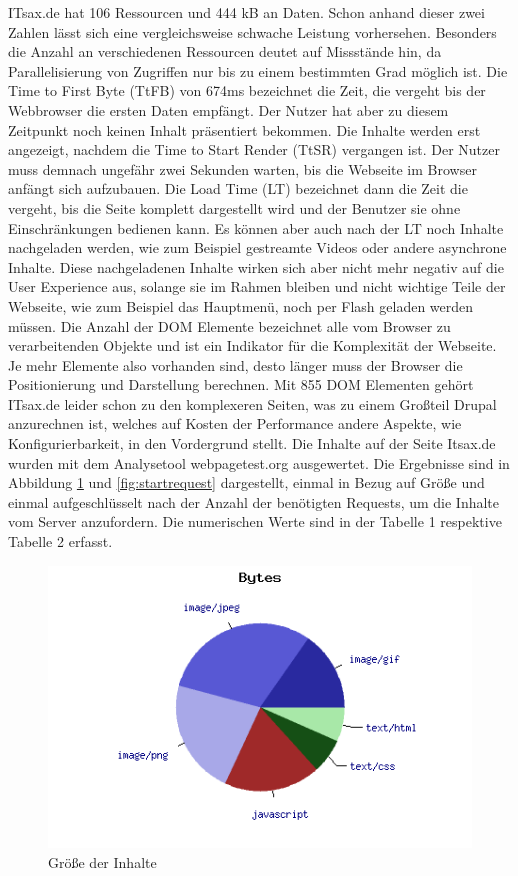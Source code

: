 ITsax.de hat 106 Ressourcen und 444 kB an Daten. Schon anhand dieser zwei Zahlen lässt sich eine vergleichsweise schwache Leistung vorhersehen. Besonders die Anzahl an verschiedenen Ressourcen deutet auf Missstände hin, da Parallelisierung von Zugriffen nur bis zu einem bestimmten Grad möglich ist. Die Time to First Byte (TtFB) von 674ms bezeichnet die Zeit, die vergeht bis der Webbrowser die ersten Daten empfängt. Der Nutzer hat aber zu diesem Zeitpunkt noch keinen Inhalt pr\"asentiert bekommen. Die Inhalte werden erst angezeigt, nachdem die Time to Start Render (TtSR) vergangen ist. Der Nutzer muss demnach ungefähr zwei Sekunden warten, bis die Webseite im Browser anfängt sich aufzubauen. Die Load Time (LT) bezeichnet dann die Zeit die vergeht, bis die Seite komplett dargestellt wird und der Benutzer sie ohne Einschränkungen bedienen kann. Es können aber auch nach der LT noch Inhalte nachgeladen werden, wie zum Beispiel gestreamte Videos oder andere asynchrone Inhalte. Diese nachgeladenen Inhalte wirken sich aber nicht mehr negativ auf die User Experience aus, solange sie im Rahmen bleiben und nicht wichtige Teile der Webseite, wie zum Beispiel das Hauptmenü, noch per Flash geladen werden müssen. Die Anzahl der DOM Elemente bezeichnet alle vom Browser zu verarbeitenden Objekte und ist ein Indikator für die Komplexität der Webseite. Je mehr Elemente also vorhanden sind, desto länger muss der Browser die Positionierung und Darstellung berechnen. Mit 855 DOM Elementen gehört ITsax.de leider schon zu den komplexeren Seiten, was zu einem Großteil Drupal anzurechnen ist, welches auf Kosten der Performance andere Aspekte, wie Konfigurierbarkeit, in den Vordergrund stellt. Die Inhalte auf der Seite Itsax.de wurden mit dem Analysetool webpagetest.org ausgewertet. Die Ergebnisse sind in Abbildung \ref{fig:startbyte} und \ref{fig:startrequest} dargestellt, einmal in Bezug auf Größe und einmal aufgeschlüsselt nach der Anzahl der benötigten Requests, um die Inhalte vom Server anzufordern. Die numerischen Werte sind in der Tabelle 1 respektive Tabelle 2 erfasst.
\begin{figure}[!ht]
  \centering
  \includegraphics[scale=0.5]{material/start_byte_pie.png}
  \caption{Größe der Inhalte}
  \label{fig:startbyte}
\end{figure}
